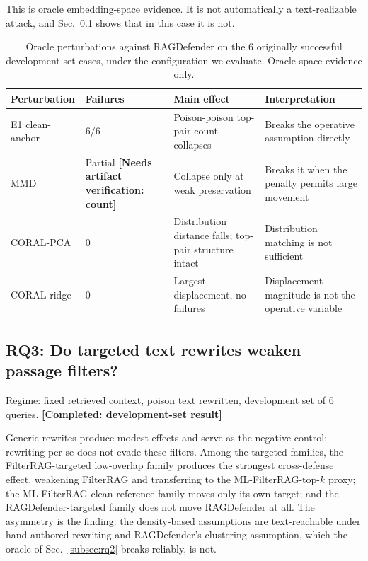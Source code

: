 \documentclass[conference]{IEEEtran}
\newcommand{\COMPLETED}[1]{\textbf{[Completed: #1]}}
\newcommand{\VERIFY}[1]{\textbf{[Needs artifact verification: #1]}}
\newcommand{\NdevQ}{6}           %
\begin{document}
This is oracle embedding-space evidence. It is not automatically a text-realizable
attack, and Sec.~\ref{subsec:rq3} shows that in this case it is not.

\begin{table}[!t]
\centering
\caption{Oracle perturbations against RAGDefender on the $\NdevQ$ originally
successful development-set cases, under the configuration we evaluate.
Oracle-space evidence only.}
\label{tab:ragdefender_oracle}
\scriptsize
\setlength{\tabcolsep}{3pt}
\renewcommand{\arraystretch}{1.05}
\begin{tabular}{@{}p{}p{}p{}p{}@{}}
\toprule
Perturbation & Failures & Main effect & Interpretation \\
\midrule
E1 clean-anchor
  & $\NdevQ/\NdevQ$
  & Poison-poison top-pair count collapses
  & Breaks the operative assumption directly \\
\addlinespace[2pt]
MMD
  & Partial \VERIFY{count}
  & Collapse only at weak preservation
  & Breaks it when the penalty permits large movement \\
\addlinespace[2pt]
CORAL-PCA
  & 0
  & Distribution distance falls; top-pair structure intact
  & Distribution matching is not sufficient \\
\addlinespace[2pt]
CORAL-ridge
  & 0
  & Largest displacement, no failures
  & Displacement magnitude is not the operative variable \\
\bottomrule
\end{tabular}
\end{table}

\subsection{RQ3: Do targeted text rewrites weaken passage filters?}
\label{subsec:rq3}
Regime: fixed retrieved context, poison text rewritten, development set of
$\NdevQ$ queries. \COMPLETED{development-set result}

Generic rewrites produce modest effects and serve as the negative control:
rewriting per se does not evade these filters. Among the targeted families, the
FilterRAG-targeted low-overlap family produces the strongest cross-defense
effect, weakening FilterRAG and transferring to the ML-FilterRAG-top-$k$ proxy;
the ML-FilterRAG clean-reference family moves only its own target; and the
RAGDefender-targeted family does not move RAGDefender at all. The asymmetry is
the finding: the density-based assumptions are text-reachable under hand-authored
rewriting and RAGDefender's clustering assumption, which the oracle of
Sec.~\ref{subsec:rq2} breaks reliably, is not.
\end{document}
